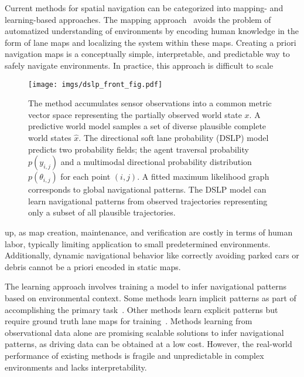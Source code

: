 \documentclass[letterpaper, 10 pt, conference]{ieeeconf}
\begin{document}
Current methods for spatial navigation can be categorized into mapping- and learning-based approaches. The mapping approach~\cite{sheif2016hdmaps} avoids the problem of automatized understanding of environments by encoding human knowledge in the form of lane maps and localizing the system within these maps.
Creating a priori navigation maps is a conceptually simple, interpretable, and predictable way to safely navigate environments.
In practice, this approach is difficult to scale


\begin{figure}[H]
\centering
\texttt{[image: imgs/dslp\_front\_fig.pdf]}
\vspace{-8mm}
\caption{The method accumulates sensor observations into a common metric vector space representing the partially observed world state $x$. A predictive world model samples a set of diverse plausible complete world states $\hat{x}$. The directional soft lane probability (DSLP) model predicts two probability fields; the agent traversal probability $p(y_{i,j})$ and a multimodal directional probability distribution $p(\theta_{i,j})$ for each point $(i,j)$. A fitted maximum likelihood graph corresponds to global navigational patterns. The DSLP model can learn navigational patterns from observed trajectories representing only a subset of all plausible trajectories.}
\label{fig:front_figure}
\vspace{-3mm}
\end{figure}

\noindent up, as map creation, maintenance, and verification are costly in terms of human labor, typically limiting application to small predetermined environments. Additionally, dynamic navigational behavior like correctly avoiding parked cars or debris cannot be a priori encoded in static maps.

The learning approach involves training a model to infer navigational patterns based on environmental context. Some methods learn implicit patterns as part of accomplishing the primary task~\cite{bojarski2016e2e_self_driving, amin2018variational_end2end, bansal2018}. Other methods learn explicit patterns but require ground truth lane maps for training~\cite{zurn2021lanegraphnet, can2021stsu}.
Methods learning from observational data alone are promising scalable solutions to infer navigational patterns, as driving data can be obtained at a low cost.
However, the real-world performance of existing methods is fragile and unpredictable in complex environments and lacks interpretability.
\end{document}
